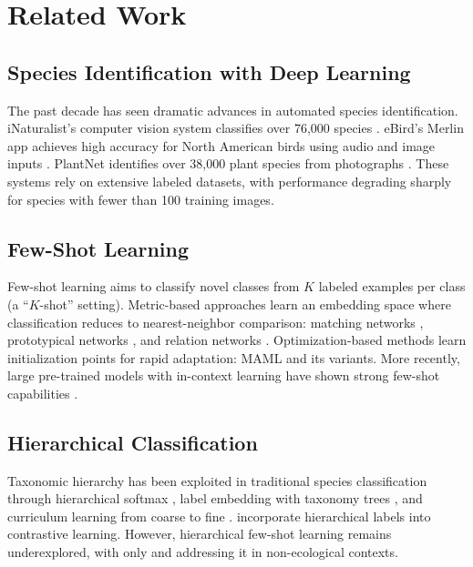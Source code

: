 \documentclass[11pt,a4paper]{article}
\begin{document}
\section{Related Work}
\label{sec:related}

\subsection{Species Identification with Deep Learning}

The past decade has seen dramatic advances in automated species
identification. iNaturalist's computer vision system classifies over
76{,}000 species \citep{van2021benchmarking}. eBird's Merlin app
achieves high accuracy for North American birds using audio and image
inputs \citep{kahl2021birdnet}. PlantNet identifies over 38{,}000 plant
species from photographs \citep{goeau2022overview}. These systems rely
on extensive labeled datasets, with performance degrading sharply for
species with fewer than 100 training images.

\subsection{Few-Shot Learning}

Few-shot learning aims to classify novel classes from $K$ labeled
examples per class (a ``$K$-shot'' setting). Metric-based approaches
learn an embedding space where classification reduces to nearest-neighbor
comparison: matching networks \citep{vinyals2016matching}, prototypical
networks \citep{snell2017prototypical}, and relation networks
\citep{sung2018learning}. Optimization-based methods learn
initialization points for rapid adaptation: MAML \citep{finn2017model}
and its variants. More recently, large pre-trained models with
in-context learning have shown strong few-shot capabilities
\citep{brown2020language}.

\subsection{Hierarchical Classification}

Taxonomic hierarchy has been exploited in traditional species
classification through hierarchical softmax \citep{deng2014large},
label embedding with taxonomy trees \citep{akata2015label}, and
curriculum learning from coarse to fine \citep{bengio2009curriculum}.
\citet{chang2021your} incorporate hierarchical labels into contrastive
learning. However, hierarchical few-shot learning remains
underexplored, with only \citet{li2019large} and
\citet{liu2020many} addressing it in non-ecological contexts.
\end{document}
